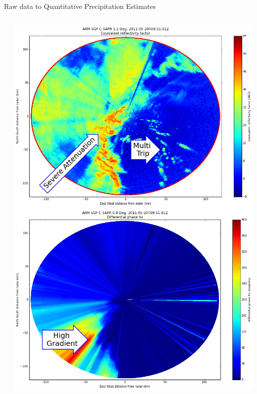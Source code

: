 \documentclass[final]{beamer}
\begin{document}
\begin{frame}{}
\begin{columns}[t]
\begin{column}{.3\linewidth}
\begin{block}{Raw data to Quantitative Precipitation Estimates}
\begin{columns}[t]
\begin{column}{.38\linewidth}
\begin{itemize}
		\end{itemize}
		\end{column}
                \begin{column}{.62\linewidth}
                \begin{columns}[t]
                \begin{column}{.5\linewidth}
                		\includegraphics[width=.95\linewidth]{figures/ze.png}\\[1ex]  %
           		\includegraphics[width=.95\linewidth]{figures/phidp_f.png}\\[1ex]   %

\end{column}
\end{columns}
\end{column}
\end{columns}
\end{block}
\end{column}
\end{columns}
\end{frame}
\end{document}
